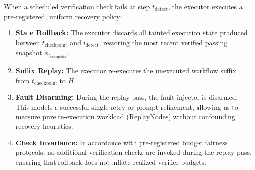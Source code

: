 When a scheduled verification check fails at step $t_{\text{detect}}$, the executor executes a pre-registered, uniform recovery policy:
\begin{enumerate}
    \item \textbf{State Rollback:} The executor discards all tainted execution state produced between $t_{\text{checkpoint}}$ and $t_{\text{detect}}$, restoring the most recent verified passing snapshot $x_{t_{\text{checkpoint}}}$.
    \item \textbf{Suffix Replay:} The executor re-executes the unexecuted workflow suffix from $t_{\text{checkpoint}}$ to $H$.
    \item \textbf{Fault Disarming:} During the replay pass, the fault injector is disarmed. This models a successful single retry or prompt refinement, allowing us to measure pure re-execution workload ($\text{ReplayNodes}$) without confounding recovery heuristics.
    \item \textbf{Check Invariance:} In accordance with pre-registered budget fairness protocols, no additional verification checks are invoked during the replay pass, ensuring that rollback does not inflate realized verifier budgets.
\end{enumerate}
